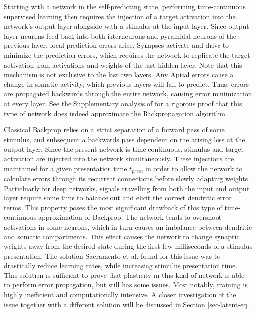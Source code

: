 Starting with a network in the self-predicting state, performing time-continuous supervised learning then requires the
injection of a target activation into the network's output layer alongside with a stimulus at the input layer. Since
output layer neurons feed back into both interneurons and pyramidal neurons of the previous layer, local prediction
errors arise. Synapses activate and drive to minimize the prediction errors, which requires the network to replicate the
target activation from activations and weights of the last hidden layer. Note that this mechanism is not exclusive to
the last two layers. Any Apical errors cause a change in somatic activity, which previous layers will fail to predict.
Thus, errors are propagated backwards through the entire network, causing error minimization at every layer. See the
Supplementary analysis of \cite{sacramento2018dendritic} for a rigorous proof that this type of network does indeed
approximate the Backpropagation algorithm.



Classical Backprop relies on a strict separation of a forward pass of some stimulus, and subsequent a backwards
pass dependent on the arising loss at the output layer. Since the present network is time-continuous, stimulus and
target activation are injected into the network simultaneously. These injections are maintained for a given presentation
time $t_{pres}$, in order to allow the network to calculate errors through its recurrent connections before slowly
adapting weights. Particluarly for deep networks, signals travelling from both the input and output layer require some
time to balance out and elicit the correct dendritic error terms. This property poses the most significant drawback of
this type of time-continuous approximation of Backprop: The network tends to overshoot activations in some
neurons, which in turn causes an imbalance between dendritic and somatic compartments. This effect causes the network to
change synaptic weights away from the desired state during the first few milliseconds of a stimulus presentation. The
solution Sacramento et al. found for this issue was to drastically reduce learning rates, while increasing stimulus
presentation time. This solution is sufficient to prove that plasticity in this kind of network is able to perform error
propagation, but still has some issues. Most notably, training is highly inefficient and computationally intensive. A
closer investigation of the issue together with a different solution will be discussed in Section \ref{sec-latent-eq}.



